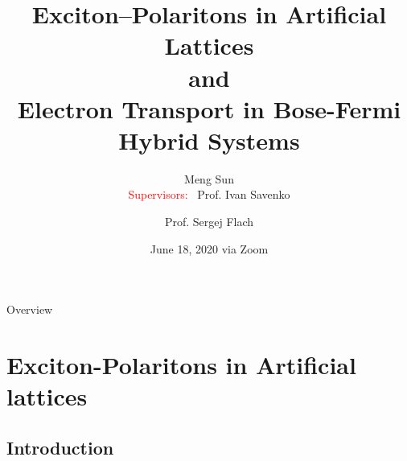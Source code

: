 \documentclass[9pt]{beamer}
\title[EPs in Artificial Lattices \& Hybrid Systems]{Exciton--Polaritons in Artificial Lattices \\and\\ Electron Transport in Bose-Fermi Hybrid Systems} %
\author[M. Sun]{Meng Sun \\
\textcolor{red}{Supervisors:~} Prof. Ivan Savenko \and Prof. Sergej Flach \\} %
\institute[UST \and IBS-PCS] %
{
University of Science \& Technology \\ %
Institute of Basic Science, Center for the Theoretical Physics of Complex System\\
\medskip
\textit{sunmeg.89@gmail.com\\} %
}
\date{ June 18, 2020 via Zoom\\} %
\begin{document}
\begin{frame}
\titlepage %
\end{frame}

\begin{frame}
Overview
\tableofcontents %

\end{frame}


\section[EPs in Artifical lattices]{Exciton-Polaritons in Artificial lattices} %

\subsection[Introduction]{Introduction} %

\end{document}
